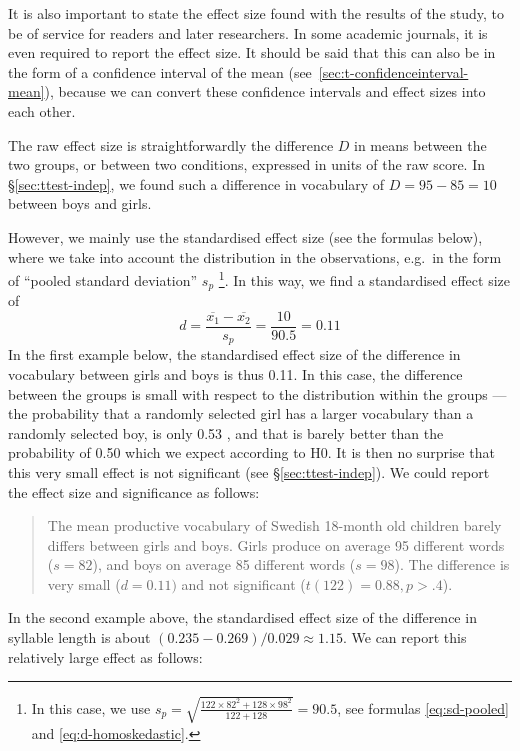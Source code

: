 \documentclass[
]{book}
\begin{document}
It is also important to state the effect size found with the results
of the study, to be of service for readers and later
researchers. In some academic journals, it is even
required to report the effect size. It should be said that this
can also be in the form of a confidence interval of the mean
(see~\ref{sec:t-confidenceinterval-mean}), because we can
convert these confidence intervals and effect sizes into
each other.

The raw effect size is straightforwardly the difference \(D\) in means
between the two groups, or between two conditions, expressed in units
of the raw score. In §\ref{sec:ttest-indep}, we found such a difference
in vocabulary of \(D=95-85=10\) between boys and girls.

However, we mainly use the standardised effect size (see
the formulas below), where we take into account the distribution in
the observations, e.g.~in the form of ``pooled standard deviation'' \(s_p\) \footnote{In this case, we use \(s_p = \sqrt{ \frac{122\times82^2+128\times98^2} {122+128} } = 90.5\), see formulas
  \eqref{eq:sd-pooled} and \eqref{eq:d-homoskedastic}.}.
In this way, we find a standardised effect size of
\begin{equation}
  \label{eq:d-standardized}
    d = \frac{ \overline{x_1}-\overline{x_2} } {s_p} = \frac{10}{90.5} = 0.11
\end{equation}
In the first example below, the standardised effect size of the difference in
vocabulary between girls and boys is thus 0.11. In this case, the difference
between the groups is small with respect to the distribution
within the groups --- the probability that a randomly selected girl
has a larger vocabulary than a randomly selected boy, is only 0.53 \citep{McGraw92},
and that is barely better than the probability of 0.50 which we expect according to H0.
It is then no surprise that this very small effect is not significant
(see §\ref{sec:ttest-indep}). We could
report the effect size and significance as follows:

\begin{quote}
The mean productive vocabulary of Swedish 18-month old children
barely differs between girls and boys. Girls
produce on average 95 different words (\(s=82\)), and boys
on average 85 different words (\(s=98\)). The difference is very
small (\(d=0.11)\) and not significant (\(t(122)=0.88, p>.4\)).
\end{quote}

In the second example above, the standardised effect size of the difference
in syllable length is about
\((0.235-0.269)/0.029 \approx 1.15\). We can report this relatively large
effect as follows:
\end{document}
